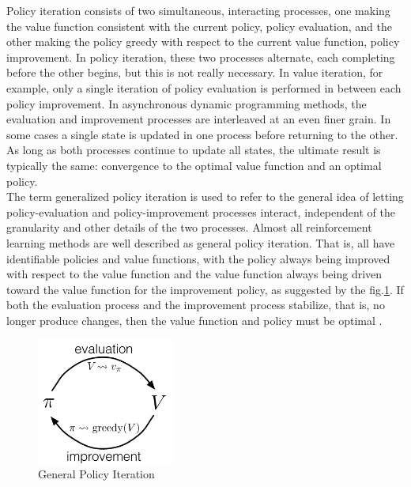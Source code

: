 Policy iteration consists of two simultaneous, interacting processes, one making the value function consistent with the current policy, policy evaluation, and the other making the policy greedy with respect to the current value function, policy improvement. In policy iteration, these two processes alternate, each completing before the other begins, but this is not really necessary. In value iteration, for example, only a single iteration of policy evaluation is performed in between each policy improvement. In asynchronous dynamic programming methods, the evaluation and improvement processes are interleaved at an even finer grain. In some cases a single state is updated in one process before returning to the other. As long as both processes continue to update all states, the ultimate result is typically the same: convergence to the optimal value function and an optimal policy. \\
The term generalized policy iteration is used to refer to the general idea of letting policy-evaluation and policy-improvement processes interact, independent of the granularity and other details of the two processes. Almost all reinforcement learning methods are well described as general policy iteration. That is, all have identifiable policies and value functions, with the policy always being improved with respect to the value function and the value function always being driven toward the value function for the improvement policy, as suggested by the fig.\ref{Fig.GPI}. If both the evaluation process and the improvement process stabilize, that is, no longer produce changes, then the value function and policy must be optimal \cite{Book.RLAI}.

\begin{figure}[H]
\includegraphics[width=0.4\textwidth,keepaspectratio]{figures/GPI.png}
\caption{General Policy Iteration \protect\cite{Book.RLAI}}
\label{Fig.GPI}
\end{figure}

